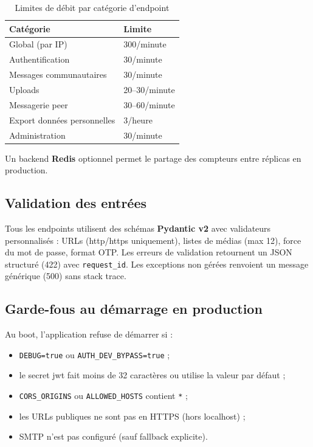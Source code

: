 \begin{table}[H]
  \centering
  \caption{Limites de débit par catégorie d'endpoint}
  \label{tab:rate-limits}
  \small
  \begin{tabular}{ll}
    \toprule
    \textbf{Catégorie} & \textbf{Limite} \\
    \midrule
    Global (par IP) & 300/minute \\
    Authentification & 30/minute \\
    Messages communautaires & 30/minute \\
    Uploads & 20--30/minute \\
    Messagerie peer & 30--60/minute \\
    Export données personnelles & 3/heure \\
    Administration & 30/minute \\
    \bottomrule
  \end{tabular}
\end{table}

Un backend \textbf{Redis} optionnel permet le partage des compteurs entre réplicas en production.

\subsection{Validation des entrées}

Tous les endpoints utilisent des schémas \textbf{Pydantic v2} avec validateurs personnalisés : URLs (http/https uniquement), listes de médias (max 12), force du mot de passe, format OTP. Les erreurs de validation retournent un JSON structuré (422) avec \texttt{request\_id}. Les exceptions non gérées renvoient un message générique (500) sans stack trace.

\subsection{Garde-fous au démarrage en production}

Au boot, l'application refuse de démarrer si :
\begin{itemize}
  \item \texttt{DEBUG=true} ou \texttt{AUTH\_DEV\_BYPASS=true} ;
  \item le secret \gls{jwt} fait moins de 32 caractères ou utilise la valeur par défaut ;
  \item \texttt{CORS\_ORIGINS} ou \texttt{ALLOWED\_HOSTS} contient \texttt{*} ;
  \item les URLs publiques ne sont pas en HTTPS (hors localhost) ;
  \item SMTP n'est pas configuré (sauf fallback explicite).
\end{itemize}

